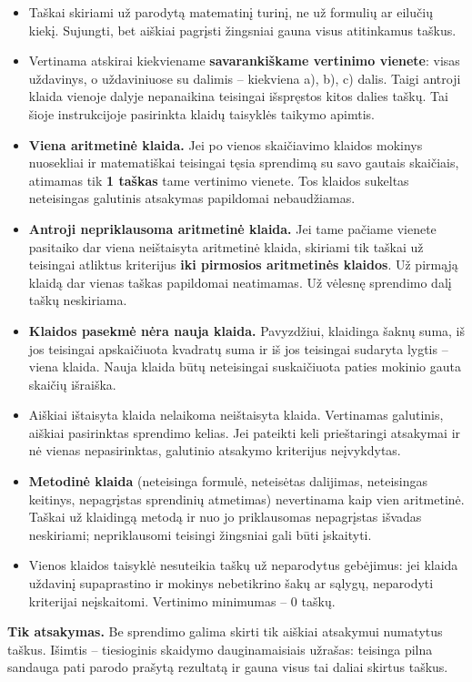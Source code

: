\documentclass[11pt,a4paper]{article}
\begin{document}
\begin{itemize}
\item Taškai skiriami už parodytą matematinį turinį, ne už formulių ar eilučių kiekį. Sujungti, bet aiškiai pagrįsti žingsniai gauna visus atitinkamus taškus.
\item Vertinama atskirai kiekviename \textbf{savarankiškame vertinimo vienete}: visas uždavinys, o uždaviniuose su dalimis -- kiekviena a), b), c) dalis. Taigi antroji klaida vienoje dalyje nepanaikina teisingai išspręstos kitos dalies taškų. Tai šioje instrukcijoje pasirinkta klaidų taisyklės taikymo apimtis.
\item \textbf{Viena aritmetinė klaida.} Jei po vienos skaičiavimo klaidos mokinys nuosekliai ir matematiškai teisingai tęsia sprendimą su savo gautais skaičiais, atimamas tik \textbf{1 taškas} tame vertinimo vienete. Tos klaidos sukeltas neteisingas galutinis atsakymas papildomai nebaudžiamas.
\item \textbf{Antroji nepriklausoma aritmetinė klaida.} Jei tame pačiame vienete pasitaiko dar viena neištaisyta aritmetinė klaida, skiriami tik taškai už teisingai atliktus kriterijus \textbf{iki pirmosios aritmetinės klaidos}. Už pirmąją klaidą dar vienas taškas papildomai neatimamas. Už vėlesnę sprendimo dalį taškų neskiriama.
\item \textbf{Klaidos pasekmė nėra nauja klaida.} Pavyzdžiui, klaidinga šaknų suma, iš jos teisingai apskaičiuota kvadratų suma ir iš jos teisingai sudaryta lygtis -- viena klaida. Nauja klaida būtų neteisingai suskaičiuota paties mokinio gauta skaičių išraiška.
\item Aiškiai ištaisyta klaida nelaikoma neištaisyta klaida. Vertinamas galutinis, aiškiai pasirinktas sprendimo kelias. Jei pateikti keli prieštaringi atsakymai ir nė vienas nepasirinktas, galutinio atsakymo kriterijus neįvykdytas.
\item \textbf{Metodinė klaida} (neteisinga formulė, neteisėtas dalijimas, neteisingas keitinys, nepagrįstas sprendinių atmetimas) nevertinama kaip vien aritmetinė. Taškai už klaidingą metodą ir nuo jo priklausomas nepagrįstas išvadas neskiriami; nepriklausomi teisingi žingsniai gali būti įskaityti.
\item Vienos klaidos taisyklė nesuteikia taškų už neparodytus gebėjimus: jei klaida uždavinį supaprastino ir mokinys nebetikrino šakų ar sąlygų, neparodyti kriterijai neįskaitomi. Vertinimo minimumas -- 0 taškų.
\end{itemize}

\textbf{Tik atsakymas.} Be sprendimo galima skirti tik aiškiai atsakymui numatytus taškus. Išimtis -- tiesioginis skaidymo dauginamaisiais užrašas: teisinga pilna sandauga pati parodo prašytą rezultatą ir gauna visus tai daliai skirtus taškus.
\end{document}
